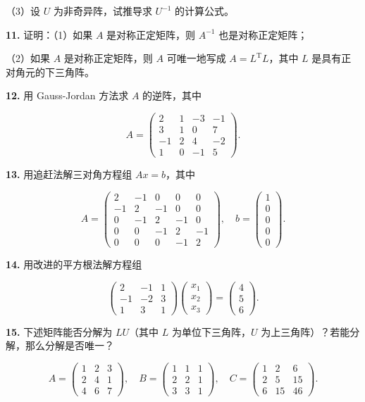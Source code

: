\documentclass[
  10pt,
  fontset=fandol]{ctexart}
\begin{document}
（3）设 \(U\) 为非奇异阵，试推导求 \(U^{-1}\) 的计算公式。

\textbf{11.} 证明：（1）如果 \(A\) 是对称正定矩阵，则 \(A^{-1}\) 也是对称正定矩阵；

（2）如果 \(A\) 是对称正定矩阵，则 \(A\) 可唯一地写成 \(A=L^{\mathrm T}L\)，其中 \(L\) 是具有正对角元的下三角阵。

\textbf{12.} 用 Gauss-Jordan 方法求 \(A\) 的逆阵，其中

\[
A=\begin{pmatrix}
2&1&-3&-1\\
3&1&0&7\\
-1&2&4&-2\\
1&0&-1&5
\end{pmatrix}.
\]

\textbf{13.} 用追赶法解三对角方程组 \(Ax=b\)，其中

\[
A=\begin{pmatrix}
2&-1&0&0&0\\
-1&2&-1&0&0\\
0&-1&2&-1&0\\
0&0&-1&2&-1\\
0&0&0&-1&2
\end{pmatrix},\quad
b=\begin{pmatrix}1\\0\\0\\0\\0\end{pmatrix}.
\]

\textbf{14.} 用改进的平方根法解方程组

\[
\begin{pmatrix}
2&-1&1\\
-1&-2&3\\
1&3&1
\end{pmatrix}
\begin{pmatrix}x_1\\x_2\\x_3\end{pmatrix}
=\begin{pmatrix}4\\5\\6\end{pmatrix}.
\]

\textbf{15.} 下述矩阵能否分解为 \(LU\)（其中 \(L\) 为单位下三角阵，\(U\) 为上三角阵）？若能分解，那么分解是否唯一？

\[
A=\begin{pmatrix}1&2&3\\2&4&1\\4&6&7\end{pmatrix},\quad
B=\begin{pmatrix}1&1&1\\2&2&1\\3&3&1\end{pmatrix},\quad
C=\begin{pmatrix}1&2&6\\2&5&15\\6&15&46\end{pmatrix}.
\]
\end{document}
